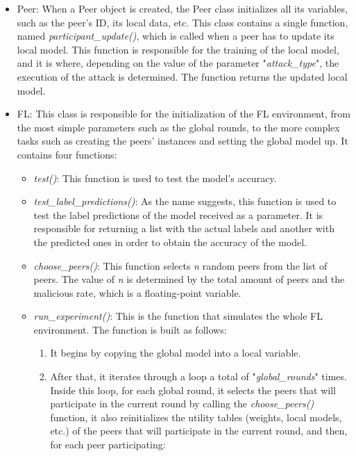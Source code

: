 \begin{itemize}
        \begin{itemize}
                \item Peer: When a Peer object is created, the Peer class initializes all its variables, such as the peer's ID, its local data, etc. This class contains a single function, named \textit{participant\_update()}, which is called when a peer has to update its local model. This function is responsible for the training of the local model, and it is where, depending on the value of the parameter "\textit{attack\_type}", the execution of the attack is determined. The function returns the updated local model.
                \item FL: This class is responsible for the initialization of the FL environment, from the most simple parameters such as the global rounds, to the more complex tasks such as creating the peers' instances and setting the global model up. It contains four functions:
                \begin{itemize}
                        \item \textit{test()}: This function is used to test the model's accuracy.
                        \item \textit{test\_label\_predictions()}: As the name suggests, this function is used to test the label predictions of the model received as a parameter. It is responsible for returning a list with the actual labels and another with the predicted ones in order to obtain the accuracy of the model.
                        \item \textit{choose\_peers()}: This function selects \textit{n} random peers from the list of peers. The value of \textit{n} is determined by the total amount of peers and the malicious rate, which is a floating-point variable.
                        \item \textit{run\_experiment()}: This is the function that simulates the whole FL environment. The function is built as follows:
                        \begin{enumerate}
                                \item It begins by copying the global model into a local variable.
                                \item After that, it iterates through a loop a total of "\textit{global\_rounds}" times. Inside this loop, for each global round, it selects the peers that will participate in the current round by calling the \textit{choose\_peers()} function, it also reinitializes the utility tables (weights, local models, etc.) of the peers that will participate in the current round, and then, for each peer participating:

\end{enumerate}
\end{itemize}
\end{itemize}
\end{itemize}
